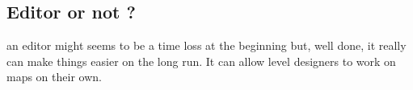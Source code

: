 \documentclass[a4paper,11pt]{article}
\begin{document}
\subsection{Editor or not ?}
an editor might seems to be a time loss at the beginning but, well done, it really can make things easier on the long run. It can allow level designers to work on maps on their own.



\newpage
\tableofcontents
\newpage
\end{document}
